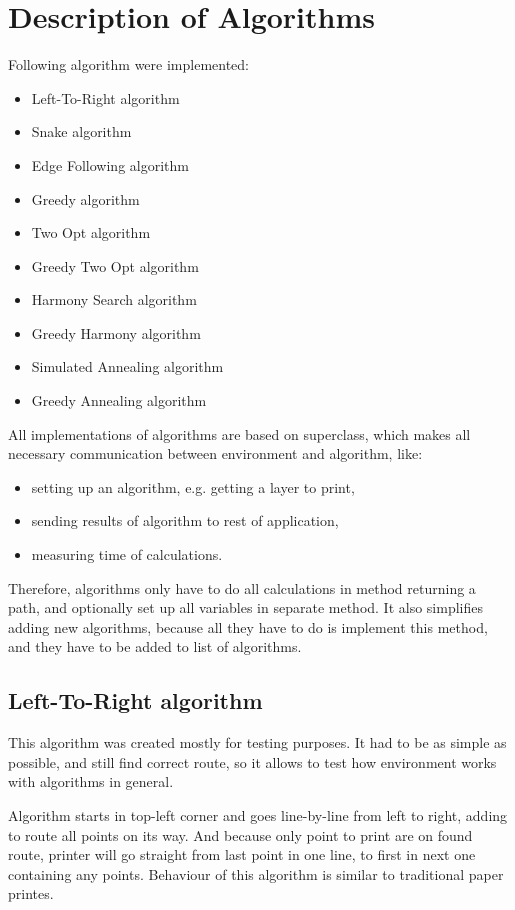 \documentclass[titlepage]{article}
\begin{document}
\section{Description of Algorithms}
Following algorithm were implemented:
\begin{itemize}
\item Left-To-Right algorithm
\item Snake algorithm
\item Edge Following algorithm
\item Greedy algorithm
\item Two Opt algorithm
\item Greedy Two Opt algorithm
\item Harmony Search algorithm
\item Greedy Harmony algorithm
\item Simulated Annealing algorithm
\item Greedy Annealing algorithm

\end{itemize}
All implementations of algorithms are based on superclass, which makes all necessary communication between environment and algorithm, like:
\begin{itemize}
\item setting up an algorithm, e.g. getting a layer to print,
\item sending results of algorithm to rest of application,
\item measuring time of calculations.
\end{itemize}
Therefore, algorithms only have to do all calculations in method returning a path, and optionally set up all variables in separate method. It also simplifies adding new algorithms, because all they have to do is implement this method, and they have to be added to list of algorithms.

\subsection{Left-To-Right algorithm}
This algorithm was created mostly for testing purposes. It had to be as simple as possible, and still find correct route, so it allows to test how environment works with algorithms in general.

Algorithm starts in top-left corner and goes line-by-line from left to right, adding to route all points on its way. And because only point to print are on found route, printer will go straight from last point in one line, to first in next one containing any points. Behaviour of this algorithm is similar to traditional paper printes.
\end{document}
